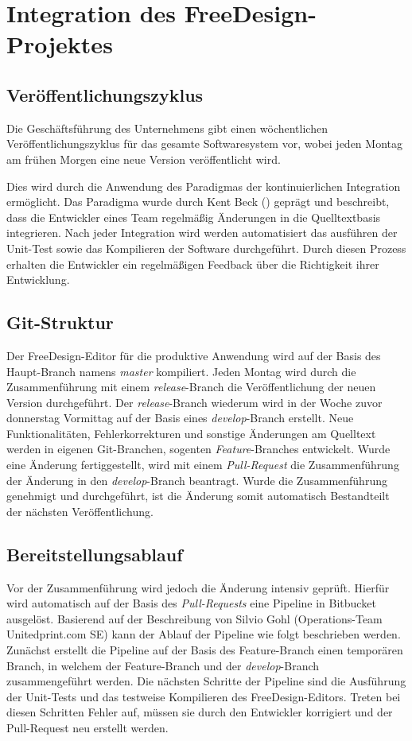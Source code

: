 \section{Integration des FreeDesign-Projektes}

\subsection{Veröffentlichungszyklus}
Die Geschäftsführung des Unternehmens gibt einen wöchentlichen Veröffentlichungszyklus für das gesamte Softwaresystem vor, wobei jeden Montag am frühen Morgen eine neue Version veröffentlicht wird. 

Dies wird durch die Anwendung des Paradigmas der kontinuierlichen Integration ermöglicht. 
Das Paradigma wurde durch Kent Beck (\citeyear[vgl.][S. 59]{Beck2004}) geprägt und beschreibt, dass die Entwickler eines Team regelmäßig Änderungen in die Quelltextbasis integrieren. Nach jeder Integration wird werden automatisiert das ausführen der Unit-Test sowie das Kompilieren der Software durchgeführt. Durch diesen Prozess erhalten die Entwickler ein regelmäßigen Feedback über die Richtigkeit ihrer Entwicklung.

\subsection{Git-Struktur}
Der FreeDesign-Editor für die produktive Anwendung wird auf der Basis des Haupt-Branch namens \emph{master} kompiliert. 
Jeden Montag wird durch die Zusammenführung mit einem \emph{release}-Branch die Veröffentlichung der neuen Version durchgeführt. 
Der \emph{release}-Branch wiederum wird in der Woche zuvor donnerstag Vormittag auf der Basis eines \emph{develop}-Branch erstellt. Neue Funktionalitäten, Fehlerkorrekturen und sonstige Änderungen am Quelltext werden in eigenen Git-Branchen, sogenten \emph{Feature}-Branches entwickelt. Wurde eine Änderung fertiggestellt, wird mit einem \emph{Pull-Request} die Zusammenführung der Änderung in den \emph{develop}-Branch beantragt.
Wurde die Zusammenführung genehmigt und durchgeführt, ist die Änderung somit automatisch Bestandteilt der nächsten Veröffentlichung. 


\subsection{Bereitstellungsablauf}
Vor der Zusammenführung wird jedoch die Änderung intensiv geprüft. Hierfür wird automatisch auf der Basis des \emph{Pull-Requests}
eine Pipeline in Bitbucket ausgelöst. 
Basierend auf der Beschreibung von Silvio Gohl (Operations-Team Unitedprint.com SE) kann der Ablauf der Pipeline wie folgt beschrieben werden.
Zunächst erstellt die Pipeline auf der Basis des Feature-Branch einen temporären Branch, in welchem der Feature-Branch und der \emph{develop}-Branch zusammengeführt werden. 
Die nächsten Schritte der Pipeline sind die Ausführung der Unit-Tests und das testweise Kompilieren des FreeDesign-Editors. Treten bei diesen Schritten Fehler auf, müssen sie durch den Entwickler korrigiert und der Pull-Request neu erstellt werden. 

